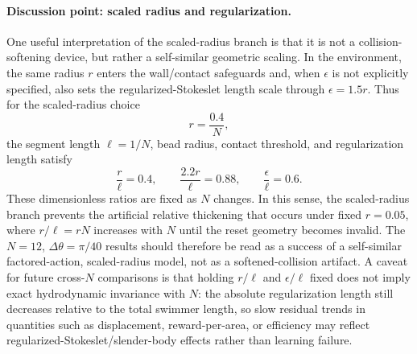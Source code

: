 \documentclass[11pt]{article}
\begin{document}
\paragraph{Discussion point: scaled radius and regularization.}
One useful interpretation of the scaled-radius branch is that it is not a collision-softening device, but rather a self-similar geometric scaling.  In the environment, the same radius $r$ enters the wall/contact safeguards and, when $\epsilon$ is not explicitly specified, also sets the regularized-Stokeslet length scale through $\epsilon=1.5r$.  Thus for the scaled-radius choice
\[
r=\frac{0.4}{N},
\]
the segment length $\ell=1/N$, bead radius, contact threshold, and regularization length satisfy
\[
\frac{r}{\ell}=0.4,\qquad
\frac{2.2r}{\ell}=0.88,\qquad
\frac{\epsilon}{\ell}=0.6.
\]
These dimensionless ratios are fixed as $N$ changes.  In this sense, the scaled-radius branch prevents the artificial relative thickening that occurs under fixed $r=0.05$, where $r/\ell=rN$ increases with $N$ until the reset geometry becomes invalid.  The $N=12$, $\Delta\theta=\pi/40$ results should therefore be read as a success of a self-similar factored-action, scaled-radius model, not as a softened-collision artifact.  A caveat for future cross-$N$ comparisons is that holding $r/\ell$ and $\epsilon/\ell$ fixed does not imply exact hydrodynamic invariance with $N$: the absolute regularization length still decreases relative to the total swimmer length, so slow residual trends in quantities such as displacement, reward-per-area, or efficiency may reflect regularized-Stokeslet/slender-body effects rather than learning failure.
\end{document}
